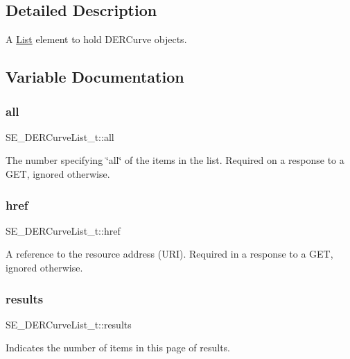 \subsection{Detailed Description}
A \hyperlink{structList}{List} element to hold D\+E\+R\+Curve objects. 

\subsection{Variable Documentation}
\mbox{\label{group__DERCurveList_gae5f34a94cb9aea726f86402b5bba15a5}} 
\subsubsection{\texorpdfstring{all}{all}}
{\footnotesize\ttfamily S\+E\+\_\+\+D\+E\+R\+Curve\+List\+\_\+t\+::all}

The number specifying \char`\"{}all\char`\"{} of the items in the list. Required on a response to a G\+ET, ignored otherwise. \mbox{\label{group__DERCurveList_ga6c40f574e49a75c46718995d9bddad2b}} 
\subsubsection{\texorpdfstring{href}{href}}
{\footnotesize\ttfamily S\+E\+\_\+\+D\+E\+R\+Curve\+List\+\_\+t\+::href}

A reference to the resource address (U\+RI). Required in a response to a G\+ET, ignored otherwise. \mbox{\label{group__DERCurveList_ga66af910e33eb63a39319b0e525723987}} 
\subsubsection{\texorpdfstring{results}{results}}
{\footnotesize\ttfamily S\+E\+\_\+\+D\+E\+R\+Curve\+List\+\_\+t\+::results}

Indicates the number of items in this page of results. 